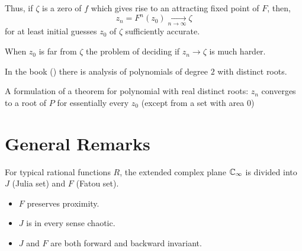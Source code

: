 Thus, if $\zeta$ is a zero of $f$ which gives rise to an attracting fixed point
of $F$, then,
\begin{equation*}
    z_n = F^n(z_0) \xrightarrow[n \to \infty]{} \zeta
\end{equation*}
for at least initial guesses $z_0$ of $\zeta$ sufficiently accurate.

When $z_0$ is far from $\zeta$ the problem of deciding if $z_n \to \zeta$ is
much harder.

In the book (\cite{Beardon1991}) there is analysis of polynomials of degree $2$
with distinct roots.

A formulation of a theorem for polynomial with real distinct roots: $z_n$
converges to a root of $P$ for essentially every $z_0$ (except from a set with
area $0$)

\section{General Remarks}
\label{sec:general_remarks}

For typical rational functions $R$, the extended complex plane $\mathbb{C}_\infty$ is
divided into $J$ (Julia set) and $F$ (Fatou set).
\begin{itemize}
    \item $F$ preserves proximity.
    \item $J$ is in every sense chaotic.
    \item $J$ and $F$ are both forward and backward invariant.
\end{itemize}